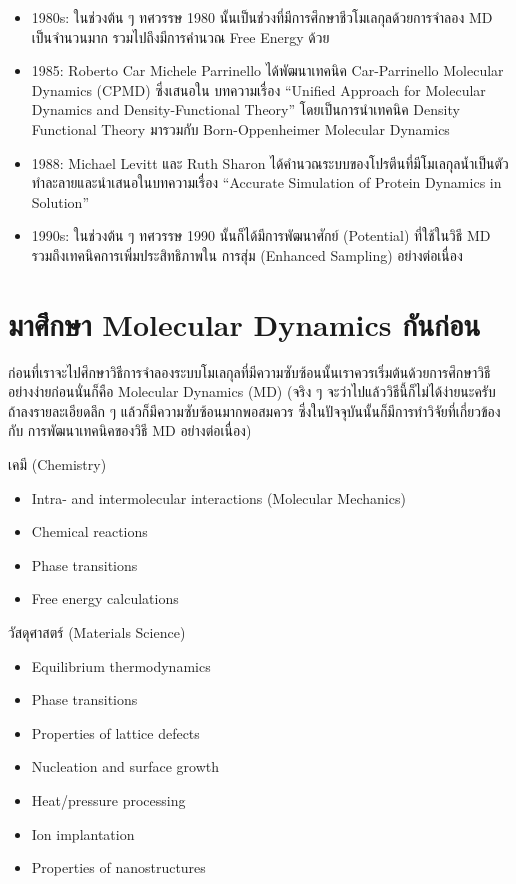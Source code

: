 \begin{itemize}
    \item 1980s: ในช่วงต้น ๆ ทศวรรษ 1980 นั้นเป็นช่วงที่มีการศึกษาชีวโมเลกุลด้วยการจำลอง MD เป็นจำนวนมาก รวมไปถึงมีการคำนวณ 
    Free Energy ด้วย

    \item 1985: Roberto Car Michele Parrinello ได้พัฒนาเทคนิค Car-Parrinello Molecular Dynamics (CPMD) ซึ่งเสนอใน%
    บทความเรื่อง \enquote{Unified Approach for Molecular Dynamics and Density-Functional Theory}\autocite{car1985} 
    โดยเป็นการนำเทคนิค Density Functional Theory มารวมกับ Born-Oppenheimer Molecular Dynamics

    \item 1988: Michael Levitt และ Ruth Sharon ได้คำนวณระบบของโปรตีนที่มีโมเลกุลน้ำเป็นตัวทำละลายและนำเสนอในบทความเรื่อง 
    \enquote{Accurate Simulation of Protein Dynamics in Solution}\autocite{levitt1988}

    \item 1990s: ในช่วงต้น ๆ ทศวรรษ 1990 นั้นก็ได้มีการพัฒนาศักย์ (Potential) ที่ใช้ในวิธี MD รวมถึงเทคนิคการเพิ่มประสิทธิภาพใน%
    การสุ่ม (Enhanced Sampling) อย่างต่อเนื่อง
\end{itemize}

\section{มาศึกษา Molecular Dynamics กันก่อน}

ก่อนที่เราจะไปศึกษาวิธีการจำลองระบบโมเลกุลที่มีความซับซ้อนนั้นเราควรเริ่มต้นด้วยการศึกษาวิธีอย่างง่ายก่อนนั่นก็คือ Molecular Dynamics (MD) 
(จริง ๆ จะว่าไปแล้ววิธีนี้ก็ไม่ได้ง่ายนะครับ ถ้าลงรายละเอียดลึก ๆ แล้วก็มีความซับซ้อนมากพอสมควร ซึ่งในปัจจุบันนั้นก็มีการทำวิจัยที่เกี่ยวข้องกับ%
การพัฒนาเทคนิคของวิธี MD อย่างต่อเนื่อง)

เคมี (Chemistry)

\begin{itemize}
    \item Intra- and intermolecular interactions (Molecular Mechanics)
    \item Chemical reactions
    \item Phase transitions
    \item Free energy calculations
\end{itemize}

วัสดุศาสตร์ (Materials Science)

\begin{itemize}
    \item Equilibrium thermodynamics
    \item Phase transitions
    \item Properties of lattice defects
    \item Nucleation and surface growth
    \item Heat/pressure processing
    \item Ion implantation
    \item Properties of nanostructures
\end{itemize}

